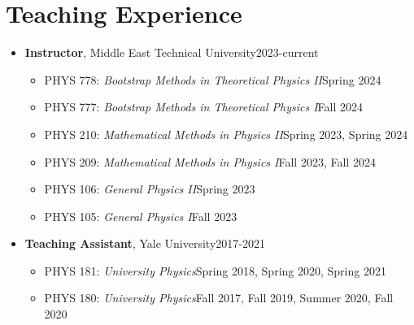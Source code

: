\documentclass[a4paper,11pt]{article}
\begin{document}
\section{\textcolor{burntorange}{Teaching Experience}}
\begin{itemize}[noitemsep,nolistsep] 
	\item[] \textbf{Instructor}, Middle East Technical University\hfill 2023-current
\vspace*{-.3em}
\begin{itemize}
	\item[] PHYS 778: \emph{Bootstrap Methods in Theoretical Physics II}\hfill Spring 2024\hspace*{2.2em}\vspace*{-.3em}
	\item[] PHYS 777: \emph{Bootstrap Methods in Theoretical Physics I}\hfill Fall 2024\hspace*{2.2em}\vspace*{-.3em}
	\item[] PHYS 210: \emph{Mathematical Methods in Physics II}\hfill Spring 2023, Spring 2024\hspace*{2.2em}\vspace*{-.3em}
	\item[] PHYS 209: \emph{Mathematical Methods in Physics I}\hfill Fall 2023, Fall 2024\hspace*{2.2em}\vspace*{-.3em}
	\item[] PHYS 106: \emph{General Physics II}\hfill Spring 2023\hspace*{2.2em}\vspace*{-.3em}
	\item[] PHYS 105: \emph{General Physics I}\hfill Fall 2023\hspace*{2.2em}\vspace*{-.3em}
\end{itemize} 
	\item[] \textbf{Teaching Assistant}, Yale University\hfill 2017-2021
	\vspace*{-.3em}
	\begin{itemize}
		\item[] PHYS 181: \emph{University Physics}\hfill Spring 2018, Spring 2020, Spring 2021\hspace*{2.2em}\vspace*{-.3em}
		\item[] PHYS 180: \emph{University Physics}\hfill Fall 2017, Fall 2019, Summer 2020, Fall 2020\hspace*{2.2em}\vspace*{-.3em}

\end{itemize}
\end{itemize}
\end{document}
